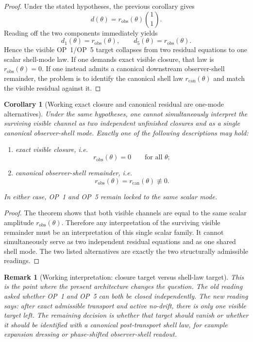 \documentclass[12pt,a4paper]{article}
\newtheorem{corollary}[theorem]{Corollary}
\newtheorem{remark}[theorem]{Remark}
\begin{document}
\begin{proof}
Under the stated hypotheses, the previous corollary gives
\[
 d(\theta)=r_{\mathrm{obs}}(\theta)\binom{1}{1}.
\]
Reading off the two components immediately yields
\[
 d_1(\theta)=r_{\mathrm{obs}}(\theta),
 \qquad
 d_5(\theta)=r_{\mathrm{obs}}(\theta).
\]
Hence the visible OP~1/OP~5 target collapses from two residual equations to one scalar shell-mode law. If one demands exact visible closure, that law is $r_{\mathrm{obs}}(\theta)=0$. If one instead admits a canonical downstream observer-shell remainder, the problem is to identify the canonical shell law $r_{\mathrm{can}}(\theta)$ and match the visible residual against it.
\end{proof}

\begin{corollary}[Working exact closure and canonical residual are one-mode alternatives]
Under the same hypotheses, one cannot simultaneously interpret the surviving visible channel as two independent unfinished closures and as a single canonical observer-shell mode. Exactly one of the following descriptions may hold:
\begin{enumerate}[leftmargin=2em,label=(\roman*)]
\item exact visible closure, i.e.
\[
 r_{\mathrm{obs}}(\theta)=0\qquad\text{for all }\theta;
\]
\item canonical observer-shell remainder, i.e.
\[
 r_{\mathrm{obs}}(\theta)=r_{\mathrm{can}}(\theta)\not\equiv 0.
\]
\end{enumerate}
In either case, OP~1 and OP~5 remain locked to the same scalar mode.
\end{corollary}

\begin{proof}
The theorem shows that both visible channels are equal to the same scalar amplitude $r_{\mathrm{obs}}(\theta)$. Therefore any interpretation of the surviving visible remainder must be an interpretation of this single scalar family. It cannot simultaneously serve as two independent residual equations and as one shared shell mode. The two listed alternatives are exactly the two structurally admissible readings.
\end{proof}

\begin{remark}[Working interpretation: closure target versus shell-law target]
This is the point where the present architecture changes the question. The old reading asked whether OP~1 and OP~5 can both be closed independently. The new reading says: after exact admissible transport and active no-drift, there is only one visible target left. The remaining decision is whether that target should vanish or whether it should be identified with a canonical post-transport shell law, for example expansion dressing or phase-shifted observer-shell readout.
\end{remark}
\end{document}
